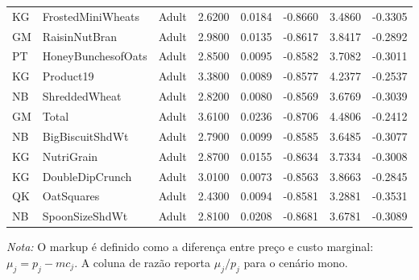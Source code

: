 \begin{table}[H]
\begin{tabular}{@{}llp{}rrrrr@{}}
KG & FrostedMiniWheats & Adult & 2.6200 & 0.0184 & -0.8660 & 3.4860 & -0.3305 \\
GM & RaisinNutBran & Adult & 2.9800 & 0.0135 & -0.8617 & 3.8417 & -0.2892 \\
PT & HoneyBunchesofOats & Adult & 2.8500 & 0.0095 & -0.8582 & 3.7082 & -0.3011 \\
KG & Product19 & Adult & 3.3800 & 0.0089 & -0.8577 & 4.2377 & -0.2537 \\
NB & ShreddedWheat & Adult & 2.8200 & 0.0080 & -0.8569 & 3.6769 & -0.3039 \\
GM & Total & Adult & 3.6100 & 0.0236 & -0.8706 & 4.4806 & -0.2412 \\
NB & BigBiscuitShdWt & Adult & 2.7900 & 0.0099 & -0.8585 & 3.6485 & -0.3077 \\
KG & NutriGrain & Adult & 2.8700 & 0.0155 & -0.8634 & 3.7334 & -0.3008 \\
KG & DoubleDipCrunch & Adult & 3.0100 & 0.0073 & -0.8563 & 3.8663 & -0.2845 \\
QK & OatSquares & Adult & 2.4300 & 0.0094 & -0.8581 & 3.2881 & -0.3531 \\
NB & SpoonSizeShdWt & Adult & 2.8100 & 0.0208 & -0.8681 & 3.6781 & -0.3089 \\
\bottomrule
\end{tabular}

\vspace{0.3em}
\scriptsize
\textit{Nota:} O markup é definido como a diferença entre preço e custo marginal: $\mu_j=p_j-mc_j$. A coluna de razão reporta $\mu_j/p_j$ para o cenário mono.
\end{table}
\endgroup


